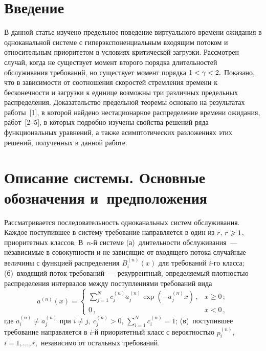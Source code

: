       \begin{multicols}{2}

            \label{st\stat}


\section{Введение}

В данной статье изучено предельное поведение виртуального времени ожидания в одноканальной 
системе с гиперэкспоненциальным
входящим потоком и относительным приоритетом в условиях критической загрузки. Рассмотрен 
случай, когда не существует момент второго порядка длительностей обслуживания требований, 
но существует момент порядка $1\hm<\gamma\hm<2.$
Показано, что в зависимости
от соотношения скоростей стремления времени к бесконечности и загрузки к единице возможны 
три различных предельных распределения.
Доказательство предельной теоремы основано на результатах работы~[1], в которой найдено 
нестационарное распределение времени ожидания,
работ~[2--5], в которых подробно изучены свойства решений ряда функциональных 
уравнений, а также асимптотических разложениях этих решений, полученных в данной работе.

\section{Описание системы. Основные обозначения и~предположения}

Рассматривается последовательность одноканальных сис\-тем обслуживания. Каждое 
поступившее в систему требование направляется в один из $r$, $r\hm\geqslant 1$, 
приоритетных классов. В~$n$-й сис\-те\-ме (а)~длительности обслуживания~---
независимые в совокупности и не зависящие от входящего потока случайные 
величины с функцией распределения $B_i^{(n)}(x)$ для требований $i$-го класса;
(б)~входящий поток требований~--- рекуррентный, определяемый плотностью распределения 
интервалов между поступлениями требований вида
$$
a^{(n)}(x)=
\begin{cases}
\sum\limits_{j=1}^{N}c_j^{(n)}a_j^{(n)}\exp\left(-a_j^{(n)}x\right)\,,& x\geqslant 0\,;\\[3pt]
0\,,& x<0\,,
\end{cases}
$$
где $a_i^{(n)}\not= a_j^{(n)}$ при $i\not= j,\ c_j^{(n)}>0$, $\sum\limits_{i=1}^{N}c_i^{(n)}=1$;
(в)~поступившее требование направляется в $i$-й приоритетный класс с вероятностью $p_i^{(n)}$,
$i=1,\ldots,r,$ независимо от остальных требований.


\end{multicols}
